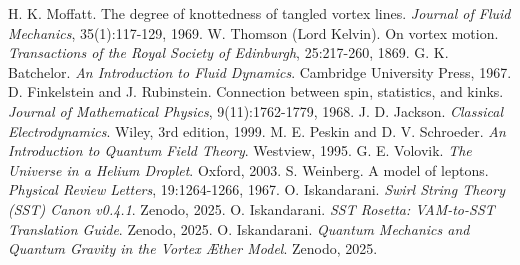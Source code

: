 \documentclass[11pt]{article}
\begin{document}
    \begin{thebibliography}{9}
     H. K. Moffatt. The degree of knottedness of tangled vortex lines. \textit{Journal of Fluid Mechanics}, 35(1):117-129, 1969.
     W. Thomson (Lord Kelvin). On vortex motion. \textit{Transactions of the Royal Society of Edinburgh}, 25:217-260, 1869.
     G. K. Batchelor. \textit{An Introduction to Fluid Dynamics}. Cambridge University Press, 1967.
     D. Finkelstein and J. Rubinstein. Connection between spin, statistics, and kinks. \textit{Journal of Mathematical Physics}, 9(11):1762-1779, 1968.
     J. D. Jackson. \textit{Classical Electrodynamics}. Wiley, 3rd edition, 1999.
     M. E. Peskin and D. V. Schroeder. \textit{An Introduction to Quantum Field Theory}. Westview, 1995.
     G. E. Volovik. \textit{The Universe in a Helium Droplet}. Oxford, 2003.
     S. Weinberg. A model of leptons. \textit{Physical Review Letters}, 19:1264-1266, 1967.
     O. Iskandarani. \textit{Swirl String Theory (SST) Canon v0.4.1}. Zenodo, 2025.
     O. Iskandarani. \textit{SST Rosetta: VAM-to-SST Translation Guide}. Zenodo, 2025.
     O. Iskandarani. \textit{Quantum Mechanics and Quantum Gravity in the Vortex Æther Model}. Zenodo, 2025.
    \end{thebibliography}
\end{document}
